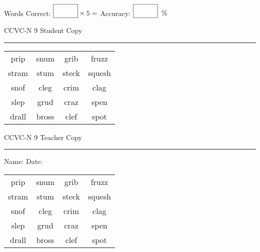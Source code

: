 \documentclass{memoir}
\begin{document}
\small

Words Correct: $\fbox{\phantom{\huge 100}} \times 5 = $ Accuracy: $\fbox{\phantom{\huge 100}}\;\; \%$ 

\vfill

\newpage


\footnotesize \noindent
CCVC-N 9 \hfill Student Copy
\smallskip
\hrule

\Large

\setlength{\tabcolsep}{14pt}
\def\arraystretch{3}

{\selectfont


\begin{vplace}[0.5]
\begin{center}
\begin{tabular}{cccc}
prip & snum & grib                    & fruzz \\
stram & stum & steck & squesh \\
snof & cleg & crim & clag \\
slep & grud & craz        & spen \\
drall & bross       & clef             & spot \\
\end{tabular}
\end{center}
\end{vplace}

}

\newpage

\footnotesize \noindent
CCVC-N 9 \hfill Teacher Copy
\smallskip
\hrule

\small

\vfill

\noindent
Name: \underline{\hspace{1.75in}} \hfill Date: \underline{\hspace{1in}}

\Large

{\selectfont


\begin{vplace}[0.5]
\begin{center}
\begin{tabular}{cccc}
prip & snum & grib                    & fruzz \\
stram & stum & steck & squesh \\
snof & cleg & crim & clag \\
slep & grud & craz        & spen \\
drall & bross       & clef             & spot \\
\end{tabular}
\end{center}
\end{vplace}



}
\end{document}
